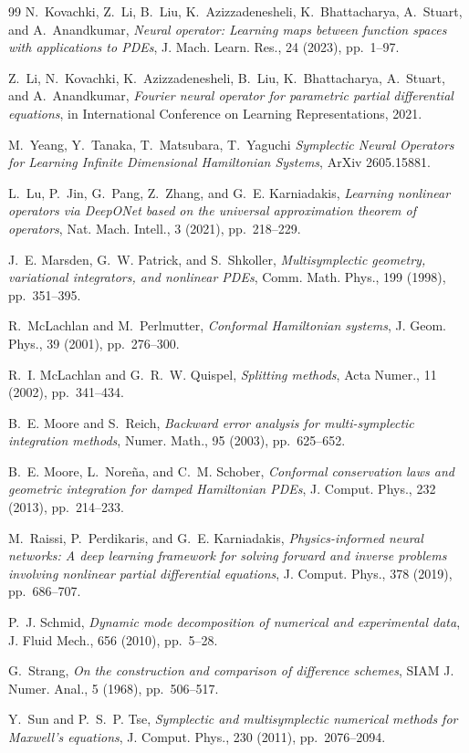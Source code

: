 \documentclass[11pt]{article}
\theoremstyle{definition}
\theoremstyle{remark}
\begin{document}
\begin{thebibliography}{99}
N.~Kovachki, Z.~Li, B.~Liu, K.~Azizzadenesheli, K.~Bhattacharya,
A.~Stuart, and A.~Anandkumar,
\emph{Neural operator: Learning maps between function spaces with
applications to PDEs},
J. Mach. Learn. Res., 24 (2023), pp.~1--97.

Z.~Li, N.~Kovachki, K.~Azizzadenesheli, B.~Liu, K.~Bhattacharya,
A.~Stuart, and A.~Anandkumar,
\emph{Fourier neural operator for parametric partial differential
equations},
in International Conference on Learning Representations, 2021.

M.~Yeang, Y.~Tanaka, T.~Matsubara, T.~Yaguchi
\emph{Symplectic Neural Operators for Learning Infinite Dimensional Hamiltonian Systems},
ArXiv 2605.15881.


L.~Lu, P.~Jin, G.~Pang, Z.~Zhang, and G.~E. Karniadakis,
\emph{Learning nonlinear operators via DeepONet based on the universal
approximation theorem of operators},
Nat. Mach. Intell., 3 (2021), pp.~218--229.

J.~E. Marsden, G.~W. Patrick, and S.~Shkoller,
\emph{Multisymplectic geometry, variational integrators, and nonlinear
PDEs},
Comm. Math. Phys., 199 (1998), pp.~351--395.

R.~McLachlan and M.~Perlmutter,
\emph{Conformal Hamiltonian systems},
J. Geom. Phys., 39 (2001), pp.~276--300.

R.~I. McLachlan and G.~R.~W. Quispel,
\emph{Splitting methods},
Acta Numer., 11 (2002), pp.~341--434.

B.~E. Moore and S.~Reich,
\emph{Backward error analysis for multi-symplectic integration
methods},
Numer. Math., 95 (2003), pp.~625--652.

B.~E. Moore, L.~Nore\~na, and C.~M. Schober,
\emph{Conformal conservation laws and geometric integration for damped
Hamiltonian PDEs},
J. Comput. Phys., 232 (2013), pp.~214--233.

M.~Raissi, P.~Perdikaris, and G.~E. Karniadakis,
\emph{Physics-informed neural networks: A deep learning framework for
solving forward and inverse problems involving nonlinear partial
differential equations},
J. Comput. Phys., 378 (2019), pp.~686--707.

P.~J. Schmid,
\emph{Dynamic mode decomposition of numerical and experimental data},
J. Fluid Mech., 656 (2010), pp.~5--28.

G.~Strang,
\emph{On the construction and comparison of difference schemes},
SIAM J. Numer. Anal., 5 (1968), pp.~506--517.

Y.~Sun and P.~S.~P. Tse,
\emph{Symplectic and multisymplectic numerical methods for Maxwell's
equations},
J. Comput. Phys., 230 (2011), pp.~2076--2094.

\end{thebibliography}
\end{document}
